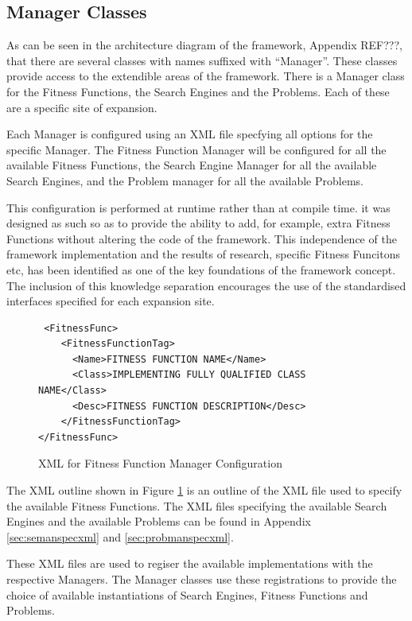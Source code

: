 \documentclass[authoryearcitations]{UoYCSproject}
\begin{document}
\subsection{Manager Classes}
As can be seen in the architecture diagram of the framework, Appendix REF???, that there are several classes with names suffixed with ``Manager''.
These classes provide access to the extendible areas of the framework.
There is a Manager class for the Fitness Functions, the Search Engines and the Problems.
Each of these are a specific site of expansion.

Each Manager is configured using an XML file specfying all options for the specific Manager.
The Fitness Function Manager will be configured for all the available Fitness Functions, the Search Engine Manager for all the available Search Engines, and the Problem manager for all the available Problems.

This configuration is performed at runtime rather than at compile time.
it was designed as such so as to provide the ability to add, for example, extra Fitness Functions without altering the code of the framework.
This independence of the framework implementation and the results of research, specific Fitness Funcitons etc, has been identified as one of the key foundations of the framework concept.
The inclusion of this knowledge separation encourages the use of the standardised interfaces specified for each expansion site.

\lstset{language=XML}
\begin{figure}
\begin{lstlisting}
 <FitnessFunc>
	<FitnessFunctionTag>
	  <Name>FITNESS FUNCTION NAME</Name>
	  <Class>IMPLEMENTING FULLY QUALIFIED CLASS NAME</Class>
	  <Desc>FITNESS FUNCTION DESCRIPTION</Desc>
	</FitnessFunctionTag>
</FitnessFunc>
\end{lstlisting}
\caption{XML for Fitness Function Manager Configuration}
\label{code:fitfuntmanconfig}
\end{figure}

The XML outline shown in Figure \ref{code:fitfuntmanconfig} is an outline of the XML file used to specify the available Fitness Functions.
The XML files specifying the available Search Engines and the available Problems can be found in Appendix \ref{sec:semanspecxml} and \ref{sec:probmanspecxml}.

These XML files are used to regiser the available implementations with the respective Managers.
The Manager classes use these registrations to provide the choice of available instantiations of Search Engines, Fitness Functions and Problems.
\end{document}
